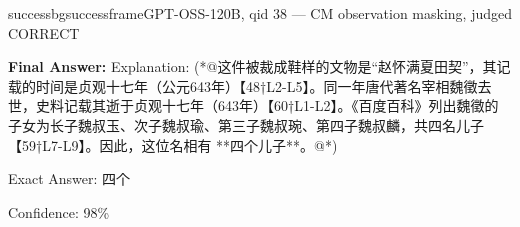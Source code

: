 \begin{casebox}{successbg}{successframe}{GPT-OSS-120B, qid 38 --- CM observation masking, judged CORRECT}
\vspace{1em}

\textbf{Final Answer:} Explanation: (*@这件被裁成鞋样的文物是“赵怀满夏田契”，其记载的时间是贞观十七年（公元643年）【48†L2-L5】。同一年唐代著名宰相魏徵去世，史料记载其逝于贞观十七年（643年）【60†L1-L2】。《百度百科》列出魏徵的子女为长子魏叔玉、次子魏叔瑜、第三子魏叔琬、第四子魏叔麟，共四名儿子【59†L7-L9】。因此，这位名相有 **四个儿子**。@*)

Exact Answer: 四个

Confidence: 98\%
\end{casebox}
